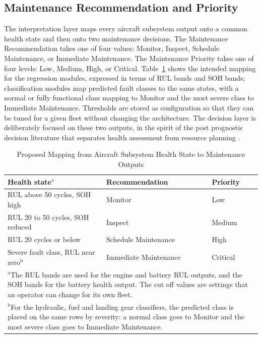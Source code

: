 \documentclass[conference]{IEEEtran}
\begin{document}
\subsection{Maintenance Recommendation and Priority}
The interpretation layer maps every aircraft subsystem output onto a common health state and then onto two maintenance decisions. The Maintenance Recommendation takes one of four values: Monitor, Inspect, Schedule Maintenance, or Immediate Maintenance. The Maintenance Priority takes one of four levels: Low, Medium, High, or Critical. Table~\ref{tab_decision} shows the intended mapping for the regression modules, expressed in terms of RUL bands and SOH bands; classification modules map predicted fault classes to the same states, with a normal or fully functional class mapping to Monitor and the most severe class to Immediate Maintenance. Thresholds are stored as configuration so that they can be tuned for a given fleet without changing the architecture. The decision layer is deliberately focused on these two outputs, in the spirit of the post prognostic decision literature that separates health assessment from resource planning \cite{b50}.

\begin{table}[htbp]
\caption{Proposed Mapping from Aircraft Subsystem Health State to Maintenance Outputs}
\begin{center}
\footnotesize
\setlength{\tabcolsep}{3pt}
\begin{tabular}{|p{1.3in}|p{1.05in}|p{0.5in}|}
\hline
\textbf{Health state}$^{\mathrm{a}}$ & \textbf{Recommendation} & \textbf{Priority} \\
\hline
RUL above 50 cycles, SOH high & Monitor & Low \\
\hline
RUL 20 to 50 cycles, SOH reduced & Inspect & Medium \\
\hline
RUL 20 cycles or below & Schedule Maintenance & High \\
\hline
Severe fault class, RUL near zero$^{\mathrm{b}}$ & Immediate Maintenance & Critical \\
\hline
\multicolumn{3}{p{2.85in}}{$^{\mathrm{a}}$The RUL bands are used for the engine and battery RUL outputs, and the SOH bands for the battery health output. The cut off values are settings that an operator can change for its own fleet.} \\
\multicolumn{3}{p{2.85in}}{$^{\mathrm{b}}$For the hydraulic, fuel and landing gear classifiers, the predicted class is placed on the same rows by severity: a normal class goes to Monitor and the most severe class goes to Immediate Maintenance.}
\end{tabular}
\label{tab_decision}
\end{center}
\end{table}
\end{document}
